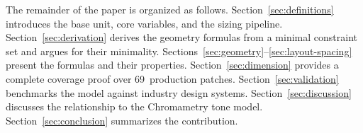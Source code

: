 The remainder of the paper is organized as follows. Section~\ref{sec:definitions} introduces the base unit, core variables, and the sizing pipeline. Section~\ref{sec:derivation} derives the geometry formulas from a minimal constraint set and argues for their minimality. Sections~\ref{sec:geometry}--\ref{sec:layout-spacing} present the formulas and their properties. Section~\ref{sec:dimension} provides a complete coverage proof over 69~production patches. Section~\ref{sec:validation} benchmarks the model against industry design systems. Section~\ref{sec:discussion} discusses the relationship to the Chromametry tone model. Section~\ref{sec:conclusion} summarizes the contribution.
